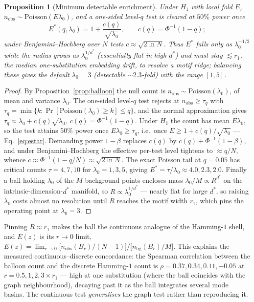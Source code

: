 \documentclass[11pt]{article}
\theoremstyle{oldplain}
\newtheorem{proposition}{Proposition}
\theoremstyle{oldrem}
\begin{document}
\begin{proposition}[Minimum detectable enrichment]\label{prop:mindetect}
Under $H_1$ with local fold $E$, $n_{\mathrm{obs}}\sim\mathrm{Poisson}(E\lambda_0)$, and a one-sided level-$q$
test is cleared at $50\%$ power once
\begin{equation}\label{eq:estar}
  E^\ast(q,\lambda_0)=1+\frac{c(q)}{\sqrt{\lambda_0}},\qquad c(q)=\Phi^{-1}(1-q);
\end{equation}
under Benjamini--Hochberg over $N$ tests $c\approx\sqrt{2\ln N}$. Thus $E^\ast$ falls only as
$\lambda_0^{-1/2}$ while the radius grows as $\lambda_0^{1/d^\ast}$ (essentially flat in high $d^\ast$) and
must stay $\lesssim r_1$, the median one-substitution embedding drift, to resolve a motif ridge; balancing
these gives the default $\lambda_0=3$ (detectable $\sim\!2.3$-fold) with the range $[1,5]$.
\end{proposition}
\begin{proof}
By Proposition~\ref{prop:balloon} the null count is $n_{\mathrm{obs}}\sim\mathrm{Poisson}(\lambda_0)$, of mean
and variance $\lambda_0$. The one-sided level-$q$ test rejects at $n_{\mathrm{obs}}\ge\tau_q$ with
$\tau_q=\min\{k:\Pr[\mathrm{Poisson}(\lambda_0)\ge k]\le q\}$, and the normal approximation gives
$\tau_q\approx\lambda_0+c(q)\sqrt{\lambda_0}$, $c(q)=\Phi^{-1}(1-q)$. Under $H_1$ the count has mean
$E\lambda_0$, so the test attains $50\%$ power once $E\lambda_0\ge\tau_q$, i.e.\ once
$E\ge1+c(q)/\sqrt{\lambda_0}$ --- Eq.~\eqref{eq:estar}. Demanding power $1-\beta$ replaces $c(q)$ by
$c(q)+\Phi^{-1}(1-\beta)$, and under Benjamini--Hochberg the effective per-test level tightens to $\approx
q/N$, whence $c\approx\Phi^{-1}(1-q/N)\approx\sqrt{2\ln N}$. The exact Poisson tail at $q{=}0.05$ has critical
counts $\tau=4,7,10$ for $\lambda_0=1,3,5$, giving $E^\ast=\tau/\lambda_0\approx4.0,2.3,2.0$. Finally a ball
holding $\lambda_0$ of the $M$ background points encloses mass $\lambda_0/M\propto R^{d^\ast}$ on the
intrinsic-dimension-$d^\ast$ manifold, so $R\propto\lambda_0^{1/d^\ast}$ --- nearly flat for large $d^\ast$,
so raising $\lambda_0$ costs almost no resolution until $R$ reaches the motif width $r_1$, which pins the
operating point at $\lambda_0=3$.
\end{proof}

Pinning $R\approx r_1$ makes the ball the continuous analogue of the Hamming-$1$ shell, and $E(z)$ is its
$r\to0$ limit, $E(z)=\lim_{r\to0}\big[n_{\mathrm{obs}}(B_r)/(N{-}1)\big]/\big[n_{\mathrm{bg}}(B_r)/M\big]$.
This explains the measured continuous--discrete concordance: the Spearman correlation between the balloon
count and the discrete Hamming-$1$ count is $\rho=0.37,0.34,0.11,-0.05$ at $r=0.5,1,2,3\times r_1$ --- high
at one substitution (where the ball coincides with the graph neighbourhood), decaying past it as the ball
integrates several mode basins. The continuous test \emph{generalises} the graph test rather than reproducing
it.
\end{document}
